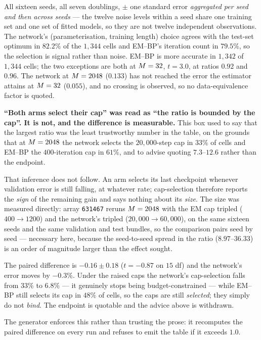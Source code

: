 All sixteen seeds, all seven doublings, $\pm$ one standard error \emph{aggregated per seed and then
across seeds} --- the twelve noise levels within a seed share one training set and one set of
fitted models, so they are not twelve independent observations. The network's
(parameterisation, training length) choice agrees with the test-set optimum in $82.2\%$ of the
$1{,}344$ cells and EM--BP's iteration count in $79.5\%$, so the selection is signal rather than
noise. EM--BP is more accurate in $1{,}342$ of $1{,}344$ cells; the two exceptions are both at
$M=32$, $t=3.0$, at ratios $0.92$ and $0.96$. The network at $M=2048$ ($0.133$) has not
reached the error the estimator attains at $M=32$ ($0.055$), and no crossing is observed, so no
data-equivalence factor is quoted.

\begin{pitfall}
\textbf{``Both arms select their cap'' was read as ``the ratio is bounded by the cap''. It is
not, and the difference is measurable.} This box used to say that the largest ratio was the least
trustworthy number in the table, on the grounds that at $M=2048$ the network selects the
$20{,}000$-step cap in $33\%$ of cells and EM--BP the $400$-iteration cap in $61\%$, and to advise
quoting $7.3$--$12.6$ rather than the endpoint.

That inference does not follow. An arm selects its last checkpoint whenever validation error is
still falling, at whatever rate; cap-selection therefore reports the \emph{sign} of the remaining
gain and says nothing about its \emph{size}. The size was measured directly: array
\texttt{631467} reruns $M=2048$ with the EM cap tripled ($400 \to 1200$) and the network's
tripled ($20{,}000 \to 60{,}000$), on the same sixteen seeds and the same validation and test
bundles, so the comparison pairs seed by seed --- necessary here, because the seed-to-seed spread
in the ratio ($8.97$--$36.33$) is an order of magnitude larger than the effect sought.

The paired difference is $-0.16 \pm 0.18$ ($t=-0.87$ on $15$ df) and the network's error moves by
$-0.3\%$. Under the raised caps the network's cap-selection falls from $33\%$ to $6.8\%$ --- it
genuinely stops being budget-constrained --- while EM--BP still selects its cap in $48\%$ of cells,
so the caps are still \emph{selected}; they simply do not \emph{bind}. The endpoint is quotable and
the advice above is withdrawn.

The generator enforces this rather than trusting the prose: it recomputes the paired difference on
every run and refuses to emit the table if it exceeds $1.0$.
\end{pitfall}

